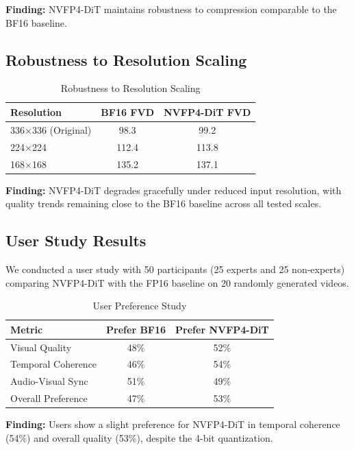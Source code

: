 \documentclass[journal,twoside]{IEEEtran}
\theoremstyle{definition}
\theoremstyle{remark}
\begin{document}
\textbf{Finding:} NVFP4-DiT maintains robustness to compression comparable to the BF16 baseline.

\subsection{Robustness to Resolution Scaling}

\begin{table}[H]
\centering
\caption{Robustness to Resolution Scaling}
\label{tab:resolution}
\begin{tabular}{lcc}
\toprule
Resolution & BF16 FVD & NVFP4-DiT FVD \\
\midrule
336$\times$336 (Original) & 98.3 & 99.2 \\
224$\times$224 & 112.4 & 113.8 \\
168$\times$168 & 135.2 & 137.1 \\
\bottomrule
\end{tabular}
\end{table}

\textbf{Finding:} NVFP4-DiT degrades gracefully under reduced input resolution, with quality trends remaining close to the BF16 baseline across all tested scales.

\subsection{User Study Results}

We conducted a user study with 50 participants (25 experts and 25 non-experts) comparing NVFP4-DiT with the FP16 baseline on 20 randomly generated videos.

\begin{table}[H]
\centering
\caption{User Preference Study}
\label{tab:user_study}
\begin{tabular}{lcc}
\toprule
Metric & Prefer BF16 & Prefer NVFP4-DiT \\
\midrule
Visual Quality & 48\% & 52\% \\
Temporal Coherence & 46\% & 54\% \\
Audio-Visual Sync & 51\% & 49\% \\
Overall Preference & 47\% & 53\% \\
\bottomrule
\end{tabular}
\end{table}

\textbf{Finding:} Users show a slight preference for NVFP4-DiT in temporal coherence (54\%) and overall quality (53\%), despite the 4-bit quantization.
\end{document}
